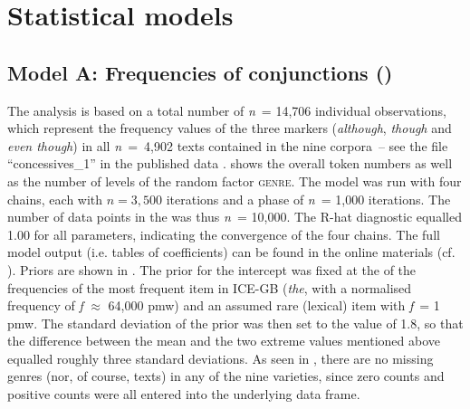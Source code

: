 \chapter{Statistical models}\label{appendix:B}

\section{Model A: Frequencies of conjunctions ()}\label{appendix:B.1}\label{bkm:Ref41307048}

The analysis is based on a total number of \textit{n}~= 14,706 individual observations, which represent the frequency values of the three markers (\textit{although}, \textit{though} and \textit{even though}) in all \textit{n~}=~4,902 texts contained in the nine corpora~– see the file “concessives\_1” in the published data \citep{Schützler2021}.  shows the overall token numbers as well as the number of levels of the random factor \textsc{genre}. The model was run with four chains, each with $n = 3{,}500$ iterations and a  phase of \textit{n}~= 1,000 iterations. The number of data points in the  was thus \textit{n}~= 10,000. The R-hat diagnostic equalled 1.00 for all parameters, indicating the convergence of the four chains. The full model output (i.e. tables of coefficients) can be found in the online materials (cf. ). Priors are shown in . The prior for the intercept was fixed at the  of the frequencies of the most frequent item in ICE-GB (\textit{the}, with a normalised frequency of \textit{f} ${\approx}$ 64,000 pmw) and an assumed rare (lexical) item with \textit{f}~= 1 pmw. The standard deviation of the prior was then set to the value of 1.8, so that the difference between the mean and the two extreme values mentioned above equalled roughly three standard deviations. As seen in , there are no missing genres (nor, of course, texts) in any of the nine varieties, since zero counts and positive counts were all entered into the underlying data frame.

